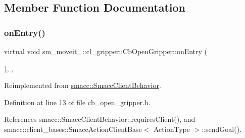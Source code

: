 \subsection{Member Function Documentation}
\mbox{\label{classsm__moveit__2_1_1cl__gripper_1_1CbOpenGripper_aaa18f60580c10e891b572f61f85ffb05}} 
\subsubsection{\texorpdfstring{on\+Entry()}{onEntry()}}
{\footnotesize\ttfamily virtual void sm\+\_\+moveit\+\_\+::cl\+\_\+gripper\+::\+Cb\+Open\+Gripper\+::on\+Entry (\begin{DoxyParamCaption}{ }\end{DoxyParamCaption})\hspace{0.3cm}{\ttfamily [inline]}, {\ttfamily [override]}, {\ttfamily [virtual]}}



Reimplemented from \hyperlink{classsmacc_1_1SmaccClientBehavior_a7962382f93987c720ad432fef55b123f}{smacc\+::\+Smacc\+Client\+Behavior}.



Definition at line 13 of file cb\+\_\+open\+\_\+gripper.\+h.



References smacc\+::\+Smacc\+Client\+Behavior\+::requires\+Client(), and smacc\+::client\+\_\+bases\+::\+Smacc\+Action\+Client\+Base$<$ Action\+Type $>$\+::send\+Goal().


